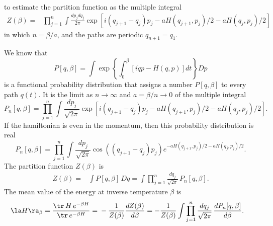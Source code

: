 \documentclass[prd,preprint,floatfix,showpacs]{revtex4-1}
\begin{document}
to estimate the partition function as
the multiple integral
\begin{equation}
\begin{split}
Z(\beta)={}& \prod_{j=1}^{n} \int \frac{dp_j dq_j}{2\pi} 
 \exp \left[  i (q_{j+1} - q_j) p_j 
 - a H(q_{j+1},p_j)/2 - a H(q_j,p_j)/2 \right]   
 \label {The partition function then is}
    \end{split}
\end{equation}
in which \( n = \beta/a \), and 
the paths are periodic \( q_{n+1} = q_1 \)\@.
\par
We know that 
\begin{equation}   
P[q,\beta] = {} \int \exp
\left\{ \int_0^\beta \left[ i \dot q p - H(q,p) \right] dt \right\}
Dp
\label {We know that }
\end{equation}
is a functional probability distribution
that assigns a number \( P[q, \beta] \)
to every path \( q(t) \)\@.
It is the limit as \( n \to \infty \) and \(  a =\beta/n \to 0 \)
of the multiple integral
\begin{equation}   
P_n[q,\beta] ={} \prod_{j=1}^n \int\frac{dp_j }{\sqrt{2\pi}} 
 \exp \left[  i (q_{j+1} - q_j) p_j 
 - a H(q_{j+1},p_j)/2 - a H(q_j,p_j)/2 \right] .
 \label {In the limit }
\end{equation}
If the hamiltonian is even in the momentum,
then this probability distribution is real
\begin{equation}   
P_n[q,\beta] ={} \prod_{j=1}^n \int\frac{dp_j }{\sqrt{2\pi}} 
 \cos((q_{j+1} - q_j) p_j) 
 e^{-a H(q_{j+1},p_j)/2 -a H(q_j,p_j)/2} .
 \label {P when H is p even}
\end{equation}
The partition function \( Z(\beta) \) is
\begin{equation}
   \begin{split}
      Z(\beta) = {}&  \int P[q, \beta] \, Dq
     = {} \int \prod_{j=1}^n \frac{dq_j}{\sqrt{2\pi}} \,
      P_n[q,\beta] .
  \label {I hope The partition function is}   
   \end{split}
\end{equation}
The mean value of the energy 
at inverse temperature \( \beta \) is
\begin{equation}
   \begin{split}
\la H \ra_\beta ={}
\frac{\tr \, H \, e^{- \beta H}} {\tr \, e^{- \beta H}}  
={}& - \frac{1}{Z(\beta)} \frac{d Z(\beta)}{d \beta}
= - \frac{1}{Z(\beta)} \int \prod_{j=1}^n \frac{dq_j}{\sqrt{2\pi}} \,
\frac{d P_n[q,\beta] }{d \beta} .
\label {mean value of the energy at beta}
   \end{split}
\end{equation}
\end{document}
